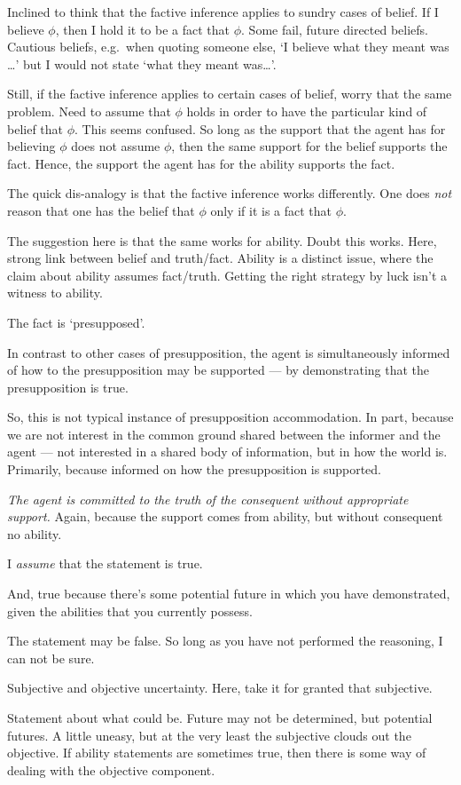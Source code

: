 \documentclass[10pt]{article}
\begin{document}
\begin{note}
  Inclined to think that the factive inference applies to sundry cases of belief.
  If I believe \(\phi\), then I hold it to be a fact that \(\phi\).
  Some fail, future directed beliefs.
  Cautious beliefs, e.g.\ when quoting someone else, `I believe what they meant was \dots' but I would not state `what they meant was\dots'.

  Still, if the factive inference applies to certain cases of belief, worry that the same problem.
  Need to assume that \(\phi\) holds in order to have the particular kind of belief that \(\phi\).
  This seems confused.
  So long as the support that the agent has for believing \(\phi\) does not assume \(\phi\), then the same support for the belief supports the fact.
  Hence, the support the agent has for the ability supports the fact.

  The quick dis-analogy is that the factive inference works differently.
  One does \emph{not} reason that one has the belief that \(\phi\) only if it is a fact that \(\phi\).

  The suggestion here is that the same works for ability.
  Doubt this works.
  Here, strong link between belief and truth/fact.
  Ability is a distinct issue, where the claim about ability assumes fact/truth.
  Getting the right strategy by luck isn't a witness to ability.

  The fact is `presupposed'.

  In contrast to other cases of presupposition, the agent is simultaneously informed of how to the presupposition may be supported --- by demonstrating that the presupposition is true.

  So, this is not typical instance of presupposition accommodation.
  In part, because we are not interest in the common ground shared between the informer and the agent --- not interested in a shared body of information, but in how the world is.
  Primarily, because informed on how the presupposition is supported.
\end{note}

\emph{The agent is committed to the truth of the consequent without appropriate support.}
Again, because the support comes from ability, but without consequent no ability.


\begin{note}
  I \emph{assume} that the statement is true.

  And, true because there's some potential future in which you have demonstrated, given the abilities that you currently possess.

  The statement may be false.
  So long as you have not performed the reasoning, I can not be sure.

  Subjective and objective uncertainty.
  Here, take it for granted that subjective.

  Statement about what could be.
  Future may not be determined, but potential futures.
  A little uneasy, but at the very least the subjective clouds out the objective.
  If ability statements are sometimes true, then there is some way of dealing with the objective component.
\end{note}
\end{document}
